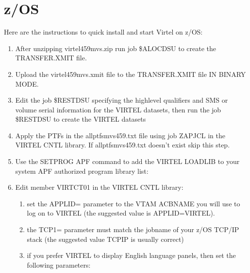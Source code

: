\documentclass[letterpaper,10pt,english]{sphinxmanual}
\begin{document}
\section{z/OS}
\label{\detokenize{Getting_Started:z-os}}
Here are the instructions to quick install and start Virtel on z/OS:
\begin{enumerate}
%
\item {} 
After unzipping virtel459mvs.zip run job \$ALOCDSU to create the TRANSFER.XMIT file.

\item {} 
Upload the virtel459mvs.xmit file to the TRANSFER.XMIT file IN BINARY MODE.

\item {} 
Edit the job \$RESTDSU specifying the high\sphinxhyphen{}level qualifiers and SMS or volume serial information for the VIRTEL datasets, then run the job \$RESTDSU to create the VIRTEL datasets

\item {} 
Apply the PTFs in the allptfs\sphinxhyphen{}mvs459.txt file using job ZAPJCL in the VIRTEL CNTL library. If allptfs\sphinxhyphen{}mvs459.txt doesn’t exist skip this step.

\item {} 
Use the SETPROG APF command to add the VIRTEL LOADLIB to your system APF authorized program library list:

\begin{sphinxVerbatim}[commandchars=\\\{\}]
 
\end{sphinxVerbatim}

\item {} 
Edit member VIRTCT01 in the VIRTEL CNTL library:
\begin{enumerate}
%
\item {} 
set the APPLID= parameter to the VTAM ACBNAME you will use to log
on to VIRTEL (the suggested value is APPLID=VIRTEL).

\item {} 
the TCP1= parameter must match the jobname of your z/OS
TCP/IP stack (the suggested value TCPIP is usually correct)

\item {} 
if you prefer VIRTEL to display English language panels, then set
the following parameters:


\end{enumerate}
\end{enumerate}
\end{document}
